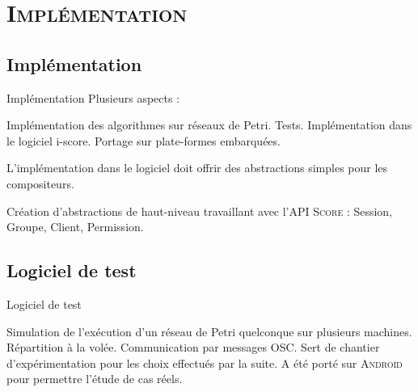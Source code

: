 \section{\scshape Implémentation}
\subsection*{Implémentation}
\begin{frame}{Implémentation}
	Plusieurs aspects : 
	
	\begin{itemize}
		\itemar Implémentation des algorithmes sur réseaux de Petri.
		\itemar Tests.
		\itemar Implémentation dans le logiciel i-score.
		\itemar Portage sur plate-formes embarquées.
	\end{itemize}
	
	L'implémentation dans le logiciel doit offrir des abstractions simples pour les compositeurs.
	
	\begin{itemize}
		\itemar Création d'abstractions de haut-niveau travaillant avec l'\textsc{API Score} : Session, Groupe, Client, Permission.
	\end{itemize}
\end{frame}

\subsection{Logiciel de test}
\begin{frame}{Logiciel de test}
	\begin{itemize}
		\itemar Simulation de l'exécution d'un réseau de Petri quelconque sur plusieurs machines.
		\itemar Répartition à la volée.
		\itemar Communication par messages \textsc{OSC}.
		\itemar Sert de chantier d'expérimentation pour les choix effectués par la suite.
		\itemar A été porté sur \textsc{Android} pour permettre l'étude de cas réels.
	\end{itemize}
\end{frame}


